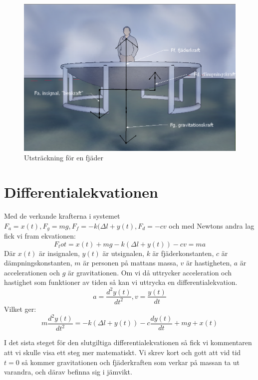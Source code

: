 \documentclass[10pt,a4paper]{article}
\begin{document}
\begin{figure}[ht]
\begin{center}
\includegraphics[scale=0.7]{shysstapilar}
\caption{Utsträckning för en fjäder}
\end{center}
\end{figure}
\newpage
\section{Differentialekvationen}

Med de verkande krafterna i systemet $F_a = x(t), F_g = mg, F_f = -k(\Delta l + y(t),F_d = -cv$ och med Newtons andra lag fick vi fram ekvationen:
\begin{equation}
F_tot = x(t) + mg - k(\Delta l + y(t)) - cv = ma
\end{equation} 
Där $x(t)$ är insignalen, $y(t)$ är utsignalen, $k$ är fjäderkonstanten, $c$ är dämpningskonstanten, $m$ är personen på mattans massa, $v$ är hastigheten, $a$ är accelerationen och $g$ är gravitationen. Om vi då uttrycker acceleration och hastighet som funktioner av tiden så kan vi uttrycka en differentialekvation.
\begin{equation}
a = \frac{d^2y(t)}{dt^2} , v = \frac{y(t)}{dt}
\end{equation}
Vilket ger:
\begin{equation}
 m\frac{d^2y(t)}{dt^2} =  -k(\Delta l + y(t)) -c\frac{dy(t)}{dt} + mg +  x(t)
\end{equation}

I det sista steget för den slutgiltiga differentialekvationen så fick vi kommentaren att vi skulle visa ett steg mer matematiskt. Vi skrev kort och gott att vid tid $t = 0$ så kommer gravitationen och fjäderkraften som verkar på massan ta ut varandra, och därav befinna sig i jämvikt.
\end{document}
